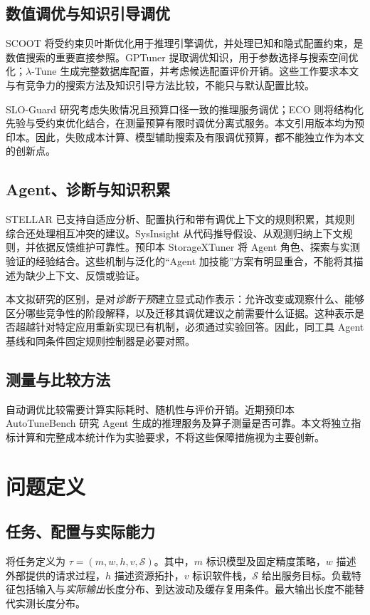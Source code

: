 \documentclass[UTF8,11pt,a4paper,fontset=windows]{ctexart}
\begin{document}
\subsection{数值调优与知识引导调优}
SCOOT 将受约束贝叶斯优化用于推理引擎调优，并处理已知和隐式配置约束\cite{scoot2025}，是数值搜索的重要直接参照。GPTuner 提取调优知识，用于参数选择与搜索空间优化；$\lambda$-Tune 生成完整数据库配置，并考虑候选配置评价开销\cite{gptuner2024,lambdatune2025}。这些工作要求本文与有竞争力的搜索方法及知识引导方法比较，不能只与默认配置比较。

SLO-Guard 研究考虑失败情况且预算口径一致的推理服务调优；ECO 则将结构化先验与受约束优化结合，在测量预算有限时调优分离式服务\cite{sloguard2026,ecotuning2026}。本文引用版本均为预印本。因此，失败成本计算、模型辅助搜索及有限调优预算，都不能独立作为本文的创新点。

\subsection{Agent、诊断与知识积累}
STELLAR 已支持自适应分析、配置执行和带有调优上下文的规则积累，其规则综合还处理相互冲突的建议\cite{stellar2025}。SysInsight 从代码推导假设、从观测归纳上下文规则，并依据反馈维护可靠性\cite{sysinsight2026}。预印本 StorageXTuner 将 Agent 角色、探索与实测验证的经验结合\cite{storagextuner2025}。这些机制与泛化的“Agent 加技能”方案有明显重合，不能将其描述为缺少上下文、反馈或验证。

本文拟研究的区别，是对\emph{诊断干预}建立显式动作表示：允许改变或观察什么、能够区分哪些竞争性的阶段解释，以及迁移其调优建议之前需要什么证据。这种表示是否超越针对特定应用重新实现已有机制，必须通过实验回答。因此，同工具 Agent 基线和同条件固定规则控制器是必要对照。

\subsection{测量与比较方法}
自动调优比较需要计算实际耗时、随机性与评价开销\cite{methodology2024}。近期预印本 AutoTuneBench 研究 Agent 生成的推理服务及算子测量是否可靠\cite{autotunebench2026}。本文将独立指标计算和完整成本统计作为实验要求，不将这些保障措施视为主要创新。

\section{问题定义}
\subsection{任务、配置与实际能力}
将任务定义为 $\tau=(m,w,h,v,\mathcal{S})$。其中，$m$ 标识模型及固定精度策略，$w$ 描述外部提供的请求过程，$h$ 描述资源拓扑，$v$ 标识软件栈，$\mathcal{S}$ 给出服务目标。负载特征包括输入与\emph{实际输出}长度分布、到达波动及缓存复用条件。最大输出长度不能替代实测长度分布。
\end{document}

